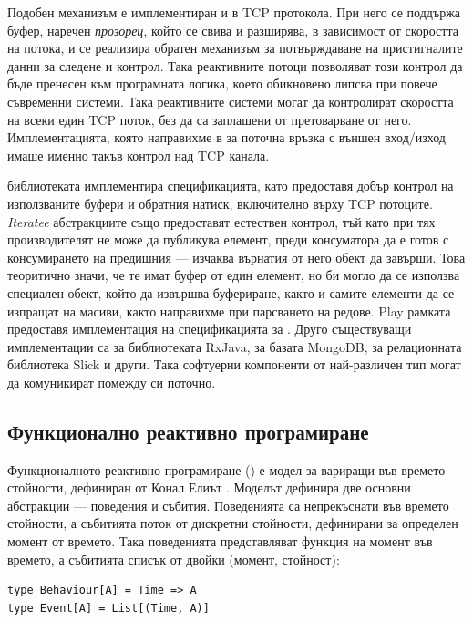 Подобен механизъм е имплементиран и в TCP протокола. При него се поддържа буфер, наречен \emph{прозорец}, който се свива и разширява, в зависимост от скоростта на потока, и се реализира обратен механизъм за потвърждаване на пристигналите данни за следене и контрол. Така реактивните потоци позволяват този контрол да бъде пренесен към програмната логика, което обикновено липсва при повече съвременни системи. Така реактивните системи могат да контролират скоростта на всеки един TCP поток, без да са заплашени от претоварване от него. Имплементацията, която направихме в  за поточна връзка с външен вход/изход имаше именно такъв контрол над TCP канала.

 библиотеката имплементира спецификацията, като предоставя добър контрол на използваните буфери и обратния натиск, включително върху TCP потоците. \emph{Iteratee} абстракциите също предоставят естествен контрол, тъй като при тях производителят не може да публикува елемент, преди консуматора да е готов с консумирането на предишния — изчаква върнатия от него  обект да завърши. Това теоритично значи, че те имат буфер от един елемент, но би могло да се използва специален  обект, който да извършва буфериране, както и самите елементи да се изпращат на масиви, както направихме при парсването на редове. Play рамката предоставя имплементация на спецификацията за . Друго съществуващи имплементации са за библиотеката RxJava, за базата MongoDB, за релационната библиотека Slick и други. Така софтуерни компоненти от най-различен тип могат да комуникират помежду си поточно.

\subsection{Функционално реактивно програмиране}

Функционалното реактивно програмиране () е модел за вариращи във времето стойности, дефиниран от Конал Елиът \cite{elliott2009PushPullFRP}. Моделът дефинира две основни абстракции — поведения и събития. Поведенията са непрекъснати във времето стойности, а събитията поток от дискретни стойности, дефинирани за определен момент от времето. Така поведенията представляват функция на момент във времето, а събитията списък от двойки (момент, стойност):

\begin{lstlisting}
type Behaviour[A] = Time => A
type Event[A] = List[(Time, A)]
\end{lstlisting}

